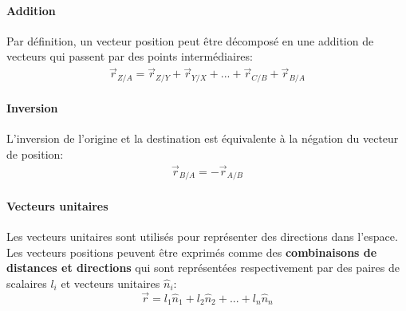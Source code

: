 \paragraph{Addition}
%
Par définition, un vecteur position peut être décomposé en une addition de vecteurs qui passent par des points intermédiaires:
\begin{align}
\vec{r}_{Z/A}  =   \vec{r}_{Z/Y} + \vec{r}_{Y/X} + ... + \vec{r}_{C/B} + \vec{r}_{B/A} 
\end{align} 
%
\paragraph{Inversion}
%
L'inversion de l'origine et la destination est équivalente à la négation du vecteur de position:
\begin{align}
\vec{r}_{B/A}  = - \vec{r}_{A/B}
\end{align} 
%
\paragraph{Vecteurs unitaires}
%
Les vecteurs unitaires sont utilisés pour représenter des directions dans l'espace. Les vecteurs positions peuvent être exprimés comme des \textbf{combinaisons de distances et directions} qui sont représentées respectivement par des paires de scalaires $l_i$ et vecteurs unitaires $\hat{n}_i$:
\begin{equation}
\vec{r} = l_1 \hat{n}_1 + l_2 \hat{n}_2 + ... + l_n \hat{n}_n
\end{equation} 



